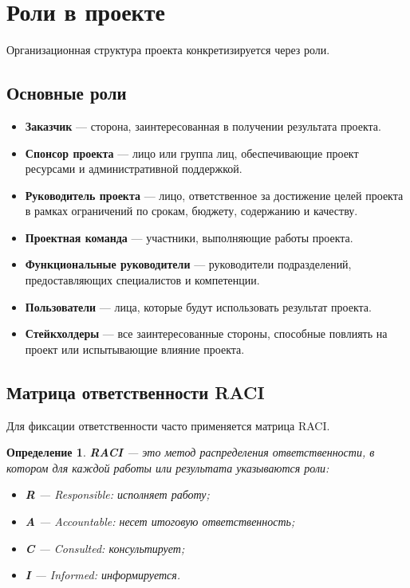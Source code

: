 \documentclass[12pt,a4paper]{article}
\newtheorem{definition}{Определение}
\begin{document}
\section{Роли в проекте}

Организационная структура проекта конкретизируется через роли.

\subsection{Основные роли}

\begin{itemize}
    \item \textbf{Заказчик} --- сторона, заинтересованная в получении результата проекта.
    \item \textbf{Спонсор проекта} --- лицо или группа лиц, обеспечивающие проект ресурсами и административной поддержкой.
    \item \textbf{Руководитель проекта} --- лицо, ответственное за достижение целей проекта в рамках ограничений по срокам, бюджету, содержанию и качеству.
    \item \textbf{Проектная команда} --- участники, выполняющие работы проекта.
    \item \textbf{Функциональные руководители} --- руководители подразделений, предоставляющих специалистов и компетенции.
    \item \textbf{Пользователи} --- лица, которые будут использовать результат проекта.
    \item \textbf{Стейкхолдеры} --- все заинтересованные стороны, способные повлиять на проект или испытывающие влияние проекта.
\end{itemize}

\subsection{Матрица ответственности RACI}

Для фиксации ответственности часто применяется матрица RACI.

\begin{definition}
\textbf{RACI} --- это метод распределения ответственности, в котором для каждой работы или результата указываются роли:
\begin{itemize}
    \item \textbf{R} --- Responsible: исполняет работу;
    \item \textbf{A} --- Accountable: несет итоговую ответственность;
    \item \textbf{C} --- Consulted: консультирует;
    \item \textbf{I} --- Informed: информируется.
\end{itemize}
\end{definition}
\end{document}

